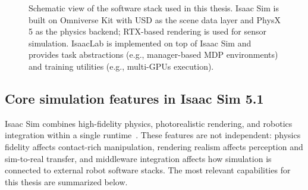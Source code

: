 \begin{figure}[ht!]
\centering
{}
\caption[Isaac Sim and IsaacLab stack]{Schematic view of the software stack used in this thesis. Isaac Sim is built on Omniverse Kit with \ac{USD} as the scene data layer and PhysX 5 as the physics backend; RTX-based rendering is used for sensor simulation. IsaacLab is implemented on top of Isaac Sim and provides task abstractions (e.g., manager-based \ac{MDP} environments) and training utilities (e.g., multi-\acp{GPU} execution).}\label{fig:isaacsim_isaaclab_stack}
\end{figure}

\subsection{Core simulation features in Isaac Sim 5.1}
Isaac Sim combines high-fidelity physics, photorealistic rendering, and robotics integration within a single runtime~\cite{nvidia_isaac_sim_510_what_is}. These features are not independent: physics fidelity affects contact-rich manipulation, rendering realism affects perception and sim-to-real transfer, and middleware integration affects how simulation is connected to external robot software stacks. The most relevant capabilities for this thesis are summarized below.

